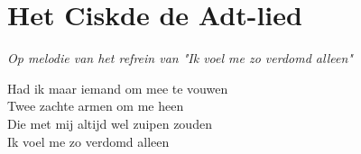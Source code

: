 \section{Het Ciskde de Adt-lied}
\textit{Op melodie van het refrein van "Ik voel me zo verdomd alleen"}

Had ik maar iemand om mee te vouwen\\
Twee zachte armen om me heen\\
Die met mij altijd wel zuipen zouden\\
Ik voel me zo verdomd alleen